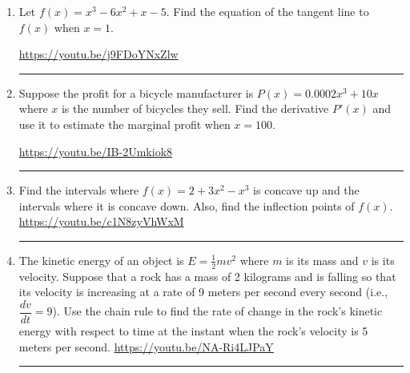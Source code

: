\documentclass[12pt]{article}
\begin{document}
\begin{enumerate}
\newpage
\item Let $f(x) = x^3 - 6x^2 + x - 5$.  Find the equation of the tangent line to $f(x)$ when $x = 1$.  
\begin{flushright}
\end{flushright}
\hfill \url{https://youtu.be/j9FDoYNxZlw}
\hrule






\item Suppose the profit for a bicycle manufacturer is $P(x) = 0.0002 x^3 + 10x$ where $x$ is the number of bicycles they sell.  Find the derivative $P'(x)$ and use it to estimate the marginal profit when $x=100$. 

\vfill
\hfill \url{https://youtu.be/IB-2Umkiok8}
\hrule


\item Find the intervals where $f(x) = 2+3x^2 - x^3$ is concave up and the intervals where it is concave down.  Also, find the inflection points of $f(x)$.  
\vfill
\hfill \url{https://youtu.be/c1N8zyVhWxM}
\hrule


\item The kinetic energy of an object is $E = \frac{1}{2} m v^2$ where $m$ is its mass and $v$ is its velocity.  Suppose that a rock has a mass of 2 kilograms and is falling so that its velocity is increasing at a rate of 9 meters per second every second (i.e., $\dfrac{dv}{dt} = 9$).  Use the chain rule to find the rate of change in the rock's kinetic energy with respect to time at the instant when the rock's velocity is 5 meters per second.  
\vfill
\hfill \url{https://youtu.be/NA-Ri4LJPaY}
\hrule 



\end{enumerate}
\end{document}
